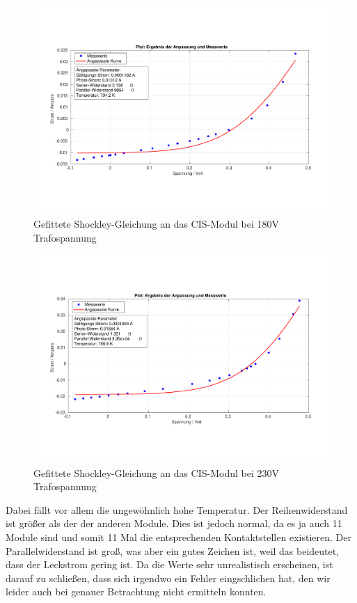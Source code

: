 \begin{figure}[ht]
    \centering
    \includegraphics[width = \linewidth]{Bilder/CIS180Plot.pdf}
    \caption{Gefittete Shockley-Gleichung an das CIS-Modul bei 180V Trafospannung}    
\end{figure}

\begin{figure}[ht]
    \centering
    \includegraphics[width = \linewidth]{Bilder/CIS230Plot.pdf}
    \caption{Gefittete Shockley-Gleichung an das CIS-Modul bei 230V Trafospannung}
\end{figure}

Dabei fällt vor allem die ungewöhnlich hohe Temperatur. Der Reihenwiderstand ist größer als der der anderen Module. Dies ist jedoch normal, da 
es ja auch 11 Module sind und somit 11 Mal die entsprechenden Kontaktstellen existieren. Der Parallelwiderstand ist groß, was aber ein gutes 
Zeichen ist, weil das beideutet, dass der Leckstrom gering ist.
Da die Werte sehr unrealistisch erscheinen, ist darauf zu schließen, dass sich irgendwo ein Fehler eingschlichen hat, 
den wir leider auch bei genauer Betrachtung nicht ermitteln konnten.

